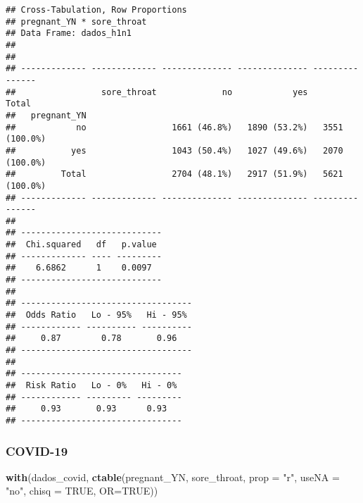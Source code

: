 \documentclass[
]{article}
\newenvironment{Shaded}{\begin{snugshade}}{\end{snugshade}}
\newcommand{\DataTypeTok}[1]{\textcolor[rgb]{0.13,0.29,0.53}{#1}}
\newcommand{\DecValTok}[1]{\textcolor[rgb]{0.00,0.00,0.81}{#1}}
\newcommand{\KeywordTok}[1]{\textcolor[rgb]{0.13,0.29,0.53}{\textbf{#1}}}
\newcommand{\NormalTok}[1]{#1}
\newcommand{\OperatorTok}[1]{\textcolor[rgb]{0.81,0.36,0.00}{\textbf{#1}}}
\newcommand{\OtherTok}[1]{\textcolor[rgb]{0.56,0.35,0.01}{#1}}
\newcommand{\StringTok}[1]{\textcolor[rgb]{0.31,0.60,0.02}{#1}}
\begin{document}
\begin{verbatim}
## Cross-Tabulation, Row Proportions  
## pregnant_YN * sore_throat  
## Data Frame: dados_h1n1  
## 
## 
## ------------- ------------- -------------- -------------- ---------------
##                 sore_throat             no            yes           Total
##   pregnant_YN                                                            
##            no                 1661 (46.8%)   1890 (53.2%)   3551 (100.0%)
##           yes                 1043 (50.4%)   1027 (49.6%)   2070 (100.0%)
##         Total                 2704 (48.1%)   2917 (51.9%)   5621 (100.0%)
## ------------- ------------- -------------- -------------- ---------------
## 
## ----------------------------
##  Chi.squared   df   p.value 
## ------------- ---- ---------
##    6.6862      1    0.0097  
## ----------------------------
## 
## ----------------------------------
##  Odds Ratio   Lo - 95%   Hi - 95% 
## ------------ ---------- ----------
##     0.87        0.78       0.96   
## ----------------------------------
## 
## --------------------------------
##  Risk Ratio   Lo - 0%   Hi - 0% 
## ------------ --------- ---------
##     0.93       0.93      0.93   
## --------------------------------
\end{verbatim}

\hypertarget{covid-19-14}{%
\subsubsection{COVID-19}\label{covid-19-14}}

\begin{Shaded}
\end{Shaded}

\begin{Shaded}
\begin{Highlighting}[]
\KeywordTok{with}\NormalTok{(dados_covid, }\KeywordTok{ctable}\NormalTok{(pregnant_YN, sore_throat, }\DataTypeTok{prop =} \StringTok{"r"}\NormalTok{, }\DataTypeTok{useNA =} \StringTok{"no"}\NormalTok{, }\DataTypeTok{chisq =} \OtherTok{TRUE}\NormalTok{, }\DataTypeTok{OR=}\OtherTok{TRUE}\NormalTok{))}
\end{Highlighting}
\end{Shaded}
\end{document}
